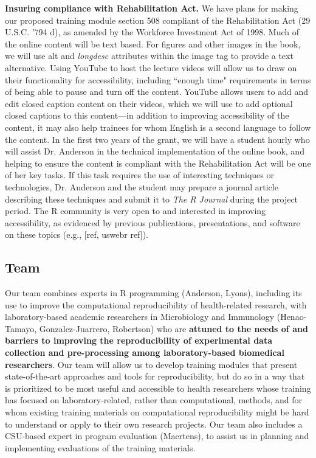 \documentclass[pdftex,english,11pt,parskip=half]{scrartcl}
\begin{document}
\noindent \textbf{Insuring compliance with Rehabilitation Act.} We have plans
for making our proposed training module section 508 compliant of the
Rehabilitation Act (29 U.S.C. '794 d), as amended by the Workforce Investment
Act of 1998. Much of the online content will be text based. For figures and
other images in the book, we will use alt and \textit{longdesc} attributes
within the image tag to provide a text alternative. Using YouTube to host the
lecture videos will allow us to draw on their functionality for accessibility,
including ``enough time" requirements in terms of being able to pause and turn
off the content. YouTube allows users to add and edit closed caption content on
their videos, which we will use to add optional closed captions to this
content---in addition to improving accessibility of the content, it may also
help trainees for whom English is a second language to follow the content. In
the first two years of the grant, we will have a student hourly who will assist
Dr. Anderson in the technical implementation of the online book, and helping to
ensure the content is compliant with the Rehabilitation Act will be one of her
key tasks. If this task requires the use of interesting techniques or
technologies, Dr. Anderson and the student may prepare a journal article
describing these techniques and submit it to \textit{The R Journal} during the
project period. The R community is very open to and interested in improving
accessibility, as evidenced by previous publications, presentations, and
software on these topics (e.g., [ref, uswebr ref]).

\subsection{Team}

Our team combines experts in R programming (Anderson, Lyons), including its use
to improve the computational reproducibility of health-related research, with
laboratory-based academic researchers in Microbiology and Immunology
(Henao-Tamayo, Gonzalez-Juarrero, Robertson) who are \textbf{attuned to the
needs of and barriers to improving the reproducibility of experimental data
collection and pre-processing among laboratory-based biomedical researchers}.
Our team will allow us to develop training modules that present state-of-the-art
approaches and tools for reproducibility, but do so in a way that is prioritized
to be most useful and accessible to health researchers whose training has
focused on laboratory-related, rather than computational, methods, and for whom
existing training materials on computational reproducibility might be hard to
understand or apply to their own research projects. Our team also includes a
CSU-based expert in program evaluation (Maertens), to assist us in planning and
implementing evaluations of the training materials.
\end{document}
